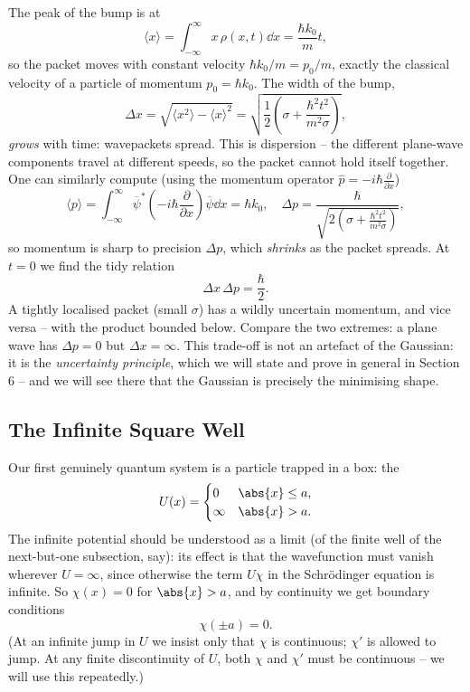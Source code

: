 The peak of the bump is at
$$
\langle x \rangle = \int_{-\infty}^{\infty} x \, \rho(x,t) \dd x = \frac{\hbar k_0}{m} t,
$$
so the packet moves with constant velocity $\hbar k_0 / m = p_0 / m$, exactly the classical velocity of a particle of momentum $p_0 = \hbar k_0$. The width of the bump,
$$
\Delta x = \sqrt{\langle x^2 \rangle - \langle x \rangle^2} = \sqrt{\frac{1}{2}\left( \sigma + \frac{\hbar^2 t^2}{m^2 \sigma} \right)},
$$
\emph{grows} with time: wavepackets spread. This is dispersion -- the different plane-wave components travel at different speeds, so the packet cannot hold itself together. One can similarly compute (using the momentum operator $\hat{p} = -i\hbar \frac{\partial}{\partial x}$)
$$
\langle p \rangle = \int_{-\infty}^\infty \overline{\psi}^* \left( -i \hbar \frac{\partial}{\partial x} \right) \overline{\psi} \dd x = \hbar k_0, \quad
\Delta p = \frac{\hbar}{\sqrt{2\left(\sigma + \frac{\hbar^2 t^2}{m^2 \sigma}\right)}},
$$
so momentum is sharp to precision $\Delta p$, which \emph{shrinks} as the packet spreads. At $t = 0$ we find the tidy relation
$$
\Delta x \, \Delta p = \frac{\hbar}{2}.
$$
A tightly localised packet (small $\sigma$) has a wildly uncertain momentum, and vice versa -- with the product bounded below. Compare the two extremes: a plane wave has $\Delta p = 0$ but $\Delta x = \infty$. This trade-off is not an artefact of the Gaussian: it is the \emph{uncertainty principle}, which we will state and prove in general in Section 6 -- and we will see there that the Gaussian is precisely the minimising shape.

\subsection{The Infinite Square Well}

Our first genuinely quantum system is a particle trapped in a box: the 
$$
U(x) = \begin{cases}
    0 & \abs{x} \leq a, \\
    \infty & \abs{x} > a.
\end{cases}
$$
The infinite potential should be understood as a limit (of the finite well of the next-but-one subsection, say): its effect is that the wavefunction must vanish wherever $U = \infty$, since otherwise the term $U \chi$ in the Schr\"odinger equation is infinite. So $\chi(x) = 0$ for $\abs{x} > a$, and by continuity we get boundary conditions
$$
\chi(\pm a) = 0.
$$
(At an infinite jump in $U$ we insist only that $\chi$ is continuous; $\chi'$ is allowed to jump. At any finite discontinuity of $U$, both $\chi$ and $\chi'$ must be continuous -- we will use this repeatedly.)

